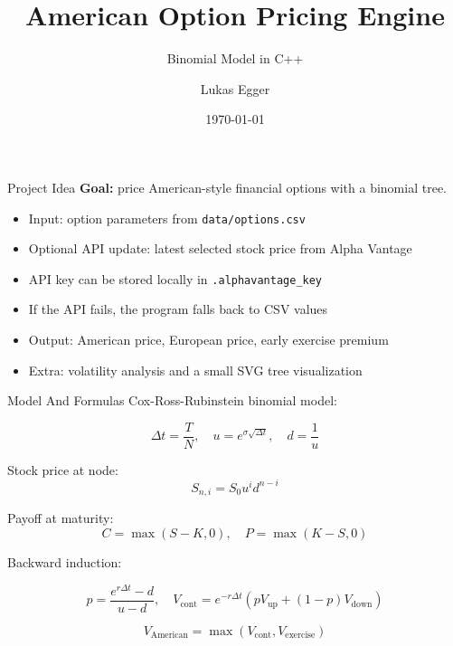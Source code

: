 \documentclass{beamer}
\title{American Option Pricing Engine}
\subtitle{Binomial Model in C++}
\author{Lukas Egger}
\date{\today}
\begin{document}
\begin{frame}{Project Idea}
  \textbf{Goal:} price American-style financial options with a binomial tree.

  \vspace{0.3cm}

  \begin{itemize}
    \item Input: option parameters from \texttt{data/options.csv}
    \item Optional API update: latest selected stock price from Alpha Vantage
    \item API key can be stored locally in \texttt{.alphavantage\_key}
    \item If the API fails, the program falls back to CSV values
    \item Output: American price, European price, early exercise premium
    \item Extra: volatility analysis and a small SVG tree visualization
  \end{itemize}
\end{frame}

\begin{frame}{Model And Formulas}
  Cox-Ross-Rubinstein binomial model:

  \[
    \Delta t = \frac{T}{N},
    \quad
    u = e^{\sigma\sqrt{\Delta t}},
    \quad
    d = \frac{1}{u}
  \]

  Stock price at node:
  \[
    S_{n,i} = S_0 u^i d^{n-i}
  \]

  Payoff at maturity:
  \[
    C = \max(S-K,0),
    \quad
    P = \max(K-S,0)
  \]

  Backward induction:

  \[
    p = \frac{e^{r\Delta t} - d}{u-d},
    \quad
    V_{\text{cont}} = e^{-r\Delta t}
    \left(pV_{\text{up}} + (1-p)V_{\text{down}}\right)
  \]

  \[
    V_{\text{American}} = \max(V_{\text{cont}}, V_{\text{exercise}})
  \]
\end{frame}
\end{document}
